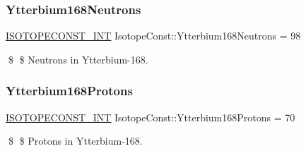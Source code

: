 \subsubsection{\texorpdfstring{Ytterbium168\+Neutrons}{Ytterbium168Neutrons}}
{\footnotesize\ttfamily \mbox{\hyperlink{group___isotope_const-_macros_ga5f18360b3e99483a35c32d789e62621c}{I\+S\+O\+T\+O\+P\+E\+C\+O\+N\+S\+T\+\_\+\+I\+NT}} Isotope\+Const\+::\+Ytterbium168\+Neutrons = 98}

\$ \$ Neutrons in Ytterbium-\/168. \mbox{\label{group___isotope_const-_ytterbium-_yb168_ga3d973d7e8c9abfe5e618fba172ca2260}} 
\subsubsection{\texorpdfstring{Ytterbium168\+Protons}{Ytterbium168Protons}}
{\footnotesize\ttfamily \mbox{\hyperlink{group___isotope_const-_macros_ga5f18360b3e99483a35c32d789e62621c}{I\+S\+O\+T\+O\+P\+E\+C\+O\+N\+S\+T\+\_\+\+I\+NT}} Isotope\+Const\+::\+Ytterbium168\+Protons = 70}

\$ \$ Protons in Ytterbium-\/168. 